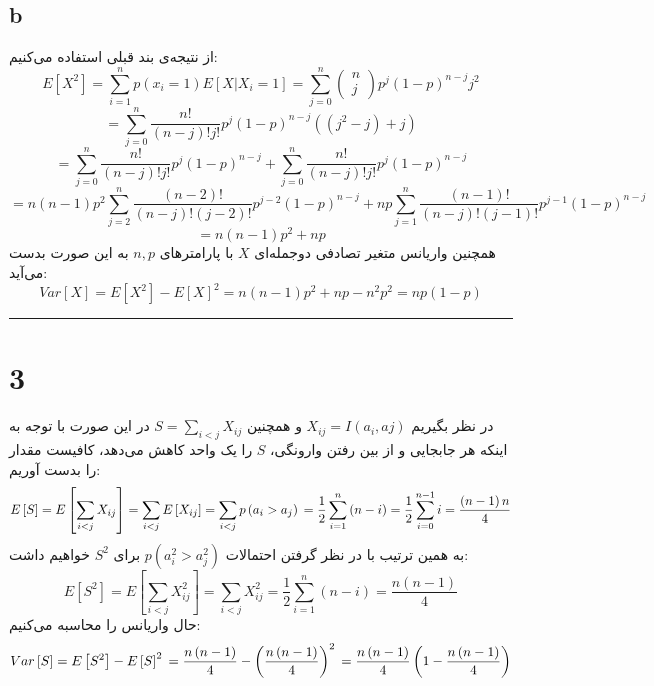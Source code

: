 \documentclass{article}
\begin{document}
\subsection*{b}
از نتیجه‌ی بند قبلی استفاده می‌کنیم:
$$E\left[ X^{2}\right] =\sum ^{n}_{i=1}p\left( x_{i}=1\right) E\left[ X| X_{i}=1\right] =\sum ^{n}_{j=0}\begin{pmatrix} n \\ j \end{pmatrix}p^{j}\left( 1-p\right) ^{n-j}j^{2}$$
$$ =\sum ^{n}_{j=0}\dfrac{n!}{\left( n-j\right) !j!}p^{j}\left( 1-p\right) ^{n-j}\left( \left( j^{2}-j\right) +j\right) $$
$$=\sum ^{n}_{j=0}\dfrac{n!}{\left( n-j\right) !j!}p^{j}\left( 1-p\right) ^{n-j}+\sum ^{n}_{j=0}\dfrac{n!}{\left( n-j\right) !j!}p^{j}\left( 1-p\right) ^{n-j}$$
$$ =n\left( n-1\right) p^{2}\sum ^{n}_{j=2}\dfrac{\left( n-2\right) !}{\left( n-j\right) !\left( j-2\right) !}p^{j-2}\left( 1-p\right) ^{n-j}+np\sum ^{n}_{j=1}\dfrac{\left( n-1\right) !}{\left( n-j\right) !\left( j-1\right) !}p^{j-1}\left( 1-p\right) ^{n-j}$$
$$ =n\left( n-1\right) p^{2}+np$$
همچنین واریانس متغیر تصادفی دوجمله‌ای
$X$
با پارامترهای
$n, p$
به این صورت بدست می‌آید:
$$Var\left[ X\right] =E\left[ X^{2}\right] -E\left[ X\right] ^{2}=n\left( n-1\right) p^{2}+np-n^{2}p^{2}=np\left( 1-p\right)$$

\rule{\linewidth}{1pt}

\section*{3}
در نظر بگیریم
$X_{ij}=I\left( a_{i},aj\right)$
و همچنین
$S=\sum _{i <j}X_{ij}$
در این صورت با توجه به اینکه هر جابجایی و از بین رفتن وارونگی،
$S$
را یک واحد کاهش می‌دهد، کافیست مقدار
را بدست آوریم:
$$E\left[ S\right] =E\left[ \sum _{i <j}X_{ij}\right] =\sum _{i <j}E\left[ X_{ij}\right] =\sum _{i <j}p\left( a_{i} >a_{j}\right) \\ =\dfrac{1}{2}\sum ^{n}_{i=1}\left( n-i\right) =\dfrac{1}{2}\sum ^{n-1}_{i=0}i=\dfrac{\left( n-1\right) n}{4}$$
به همین ترتیب با در نظر گرفتن احتمالات
$p( a_{i}^{2} > a_{j}^{2})$
برای 
$S^2$
خواهیم داشت:
$$E\left[ S^{2}\right] =E\left[ \sum _{i <j}X_{ij}^{2}\right] =\sum _{i <j}X_{ij}^{2}=\dfrac{1}{2}\sum ^{n}_{i=1}\left( n-i\right) =\dfrac{n\left( n-1\right) }{4}$$
حال واریانس را محاسبه می‌کنیم:
$$Var\left[ S\right] =E\left[ S^{2}\right] -E\left[ S\right] ^{2}\\ =\dfrac{n\left( n-1\right) }{4}-\left( \dfrac{n\left( n-1\right) }{4}\right) ^{2}\\ =\dfrac{n\left( n-1\right) }{4}\left( 1-\dfrac{n\left( n-1\right) }{4}\right)$$
\end{document}
